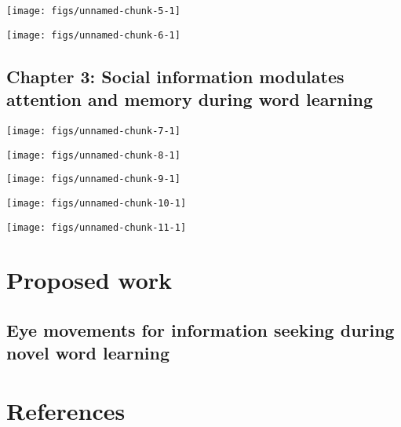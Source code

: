 \documentclass[]{elsarticle} %
\begin{document}
\begin{center}\texttt{[image: figs/unnamed-chunk-5-1]} \end{center}

\begin{center}\texttt{[image: figs/unnamed-chunk-6-1]} \end{center}

\subsection{Chapter 3: Social information modulates attention and memory
during word learning}\label{ch3}

\begin{center}\texttt{[image: figs/unnamed-chunk-7-1]} \end{center}

\begin{center}\texttt{[image: figs/unnamed-chunk-8-1]} \end{center}

\begin{center}\texttt{[image: figs/unnamed-chunk-9-1]} \end{center}

\begin{center}\texttt{[image: figs/unnamed-chunk-10-1]} \end{center}

\begin{center}\texttt{[image: figs/unnamed-chunk-11-1]} \end{center}

\section{Proposed work}\label{proposal}

\subsection{Eye movements for information seeking during novel word
learning}\label{eye-movements-for-information-seeking-during-novel-word-learning}

\section{References}\label{references}
\end{document}
